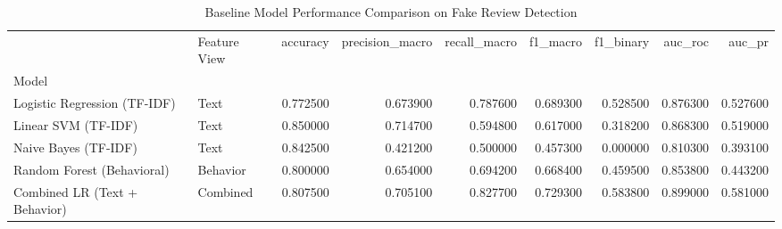 \begin{table}
\caption{Baseline Model Performance Comparison on Fake Review Detection}
\label{tab:baselines}
\begin{tabular}{llrrrrrrr}
\toprule
 & Feature View & accuracy & precision_macro & recall_macro & f1_macro & f1_binary & auc_roc & auc_pr \\
Model &  &  &  &  &  &  &  &  \\
\midrule
Logistic Regression (TF-IDF) & Text & 0.772500 & 0.673900 & 0.787600 & 0.689300 & 0.528500 & 0.876300 & 0.527600 \\
Linear SVM (TF-IDF) & Text & 0.850000 & 0.714700 & 0.594800 & 0.617000 & 0.318200 & 0.868300 & 0.519000 \\
Naive Bayes (TF-IDF) & Text & 0.842500 & 0.421200 & 0.500000 & 0.457300 & 0.000000 & 0.810300 & 0.393100 \\
Random Forest (Behavioral) & Behavior & 0.800000 & 0.654000 & 0.694200 & 0.668400 & 0.459500 & 0.853800 & 0.443200 \\
Combined LR (Text + Behavior) & Combined & 0.807500 & 0.705100 & 0.827700 & 0.729300 & 0.583800 & 0.899000 & 0.581000 \\
\bottomrule
\end{tabular}
\end{table}
